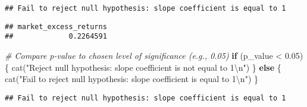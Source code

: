 \documentclass[
]{article}
\newenvironment{Shaded}{\begin{snugshade}}{\end{snugshade}}
\newcommand{\CommentTok}[1]{\textcolor[rgb]{0.56,0.35,0.01}{\textit{#1}}}
\newcommand{\ControlFlowTok}[1]{\textcolor[rgb]{0.13,0.29,0.53}{\textbf{#1}}}
\newcommand{\DecValTok}[1]{\textcolor[rgb]{0.00,0.00,0.81}{#1}}
\newcommand{\FloatTok}[1]{\textcolor[rgb]{0.00,0.00,0.81}{#1}}
\newcommand{\FunctionTok}[1]{\textcolor[rgb]{0.00,0.00,0.00}{#1}}
\newcommand{\NormalTok}[1]{#1}
\newcommand{\OtherTok}[1]{\textcolor[rgb]{0.56,0.35,0.01}{#1}}
\newcommand{\SpecialCharTok}[1]{\textcolor[rgb]{0.00,0.00,0.00}{#1}}
\newcommand{\StringTok}[1]{\textcolor[rgb]{0.31,0.60,0.02}{#1}}
\begin{document}
\begin{verbatim}
## Fail to reject null hypothesis: slope coefficient is equal to 1
\end{verbatim}

\begin{Shaded}
\end{Shaded}

\begin{verbatim}
## market_excess_returns 
##             0.2264591
\end{verbatim}

\begin{Shaded}
\begin{Highlighting}[]
\CommentTok{\# Compare p{-}value to chosen level of significance (e.g., 0.05)}
\ControlFlowTok{if}\NormalTok{ (p\_value }\SpecialCharTok{\textless{}} \FloatTok{0.05}\NormalTok{) \{}
  \FunctionTok{cat}\NormalTok{(}\StringTok{"Reject null hypothesis: slope coefficient is not equal to 1}\SpecialCharTok{\textbackslash{}n}\StringTok{"}\NormalTok{)}
\NormalTok{\} }\ControlFlowTok{else}\NormalTok{ \{}
  \FunctionTok{cat}\NormalTok{(}\StringTok{"Fail to reject null hypothesis: slope coefficient is equal to 1}\SpecialCharTok{\textbackslash{}n}\StringTok{"}\NormalTok{)}
\NormalTok{\}}
\end{Highlighting}
\end{Shaded}

\begin{verbatim}
## Fail to reject null hypothesis: slope coefficient is equal to 1
\end{verbatim}
\end{document}
